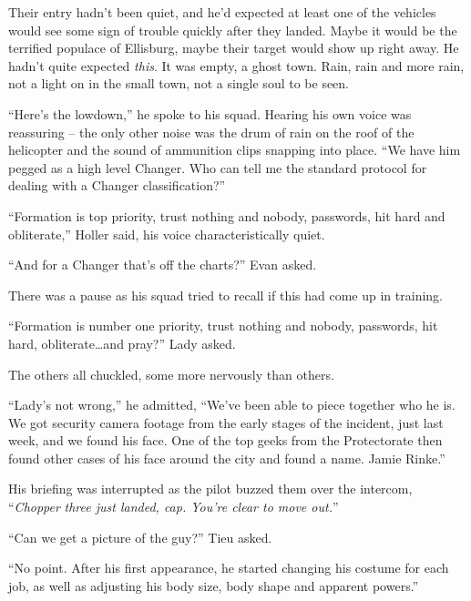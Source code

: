 Their entry hadn't been quiet, and he'd expected at least one of the vehicles would see some sign of trouble quickly after they landed.  Maybe it would be the terrified populace of Ellisburg, maybe their target would show up right away.  He hadn't quite expected \emph{this}.  It was empty, a ghost town.  Rain, rain and more rain, not a light on in the small town, not a single soul to be seen.



``Here's the lowdown,'' he spoke to his squad.  Hearing his own voice was reassuring – the only other noise was the drum of rain on the roof of the helicopter and the sound of ammunition clips snapping into place. ``We have him pegged as a high level Changer.  Who can tell me the standard protocol for dealing with a Changer classification?''



``Formation is top priority, trust nothing and nobody, passwords, hit hard and obliterate,'' Holler said, his voice characteristically quiet.



``And for a Changer that's off the charts?''  Evan asked.



There was a pause as his squad tried to recall if this had come up in training.



``Formation is number one priority, trust nothing and nobody, passwords, hit hard, obliterate\ldots and pray?'' Lady asked.



The others all chuckled, some more nervously than others.



``Lady's not wrong,'' he admitted, ``We've been able to piece together who he is.  We got security camera footage from the early stages of the incident, just last week, and we found his face.  One of the top geeks from the Protectorate then found other cases of his face around the city and found a name.  Jamie Rinke.''



His briefing was interrupted as the pilot buzzed them over the intercom, ``\emph{Chopper }\emph{three just landed, cap.  You're clear to move out.}''



``Can we get a picture of the guy?''  Tieu asked.



``No point.  After his first appearance, he started changing his costume for each job, as well as adjusting his body size, body shape and apparent powers.''



